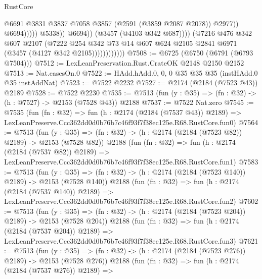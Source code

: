\begin{lexlean}{RustCore}
\begin{coremodule}
                                              @6691
                                              @3831
                                              @3837
                                              @7058
                                              @3857
                                              (@2591 (@3859 @2087 @2078))
                                              @2977))
                                          @6694)))))
                                @5338))
                            @6694))
                        (@3457 (@4103 @342 @687))))
                    (@7216
                      @476
                      @342
                      @607
                      @2107
                      (@7222
                        @254
                        @342
                        @73
                        @14
                        @607
                        @624
                        @2105
                        @2841
                        @6971
                        (@3457 (@4127 @342 @2105))))))))))))
@7508 := @6725 (@6750 (@6791 (@6793 @7504)))
@7512 := LexLeanPreservation.Rust.CrateOK @2148 @2150 @2152
@7513 := Nat.casesOn.{0}
@7522 := HAdd.hAdd.{0, 0, 0} @35 @35 @35 (instHAdd.{0} @35 instAddNat)
@7523 := @7522 @2232
@7527 := @2174 (@2184 (@7523 @43)) @2189
@7528 := @7522 @2230
@7535 := @7513 (fun (y : @35) => (fn : @32) -> (h : @7527) -> @2153 (@7528 @43)) @2188
@7537 := @7522 Nat.zero
@7545 := @7535
    (fun (fn : @32) =>
    fun (h : @2174 (@2184 (@7537 @43)) @2189) =>
    LexLeanPreserve.Ccc362dd0d0b76b7c46f93f7f38ec125e.R68.RustCore.fun0)
@7564 := @7513
    (fun (y : @35) => (fn : @32) -> (h : @2174 (@2184 (@7523 @82)) @2189) -> @2153 (@7528 @82))
    @2188
    (fun (fn : @32) =>
    fun (h : @2174 (@2184 (@7537 @82)) @2189) =>
    LexLeanPreserve.Ccc362dd0d0b76b7c46f93f7f38ec125e.R68.RustCore.fun1)
@7583 := @7513
    (fun (y : @35) => (fn : @32) -> (h : @2174 (@2184 (@7523 @140)) @2189) -> @2153 (@7528 @140))
    @2188
    (fun (fn : @32) =>
    fun (h : @2174 (@2184 (@7537 @140)) @2189) =>
    LexLeanPreserve.Ccc362dd0d0b76b7c46f93f7f38ec125e.R68.RustCore.fun2)
@7602 := @7513
    (fun (y : @35) => (fn : @32) -> (h : @2174 (@2184 (@7523 @204)) @2189) -> @2153 (@7528 @204))
    @2188
    (fun (fn : @32) =>
    fun (h : @2174 (@2184 (@7537 @204)) @2189) =>
    LexLeanPreserve.Ccc362dd0d0b76b7c46f93f7f38ec125e.R68.RustCore.fun3)
@7621 := @7513
    (fun (y : @35) => (fn : @32) -> (h : @2174 (@2184 (@7523 @276)) @2189) -> @2153 (@7528 @276))
    @2188
    (fun (fn : @32) =>
    fun (h : @2174 (@2184 (@7537 @276)) @2189) =>

\end{coremodule}
\end{lexlean}
